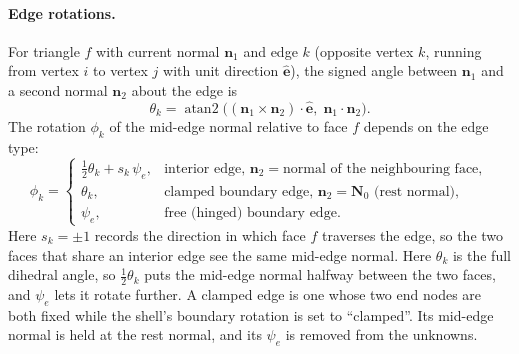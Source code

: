 \documentclass[11pt,a4paper]{article}
\newcommand{\vect}[1]{\bm{#1}}
\newcommand{\n}{\vect{n}}
\theoremstyle{remark}
\begin{document}
\paragraph{Edge rotations.} For triangle $f$ with current normal $\n_1$ and edge $k$ (opposite
vertex $k$, running from vertex $i$ to vertex $j$ with unit direction $\hat{\vect{e}}$), the
signed angle between $\n_1$ and a second normal $\n_2$ about the edge is
\begin{equation}
\theta_k = \operatorname{atan2}\big((\n_1\times\n_2)\cdot\hat{\vect{e}},\; \n_1\cdot\n_2\big).
\end{equation}
The rotation $\phi_k$ of the mid-edge normal relative to face $f$ depends on the edge type:
\begin{equation}
\phi_k = \begin{cases}
\tfrac12\theta_k + s_k\,\psi_e, & \text{interior edge, } \n_2 = \text{normal of the neighbouring face},\\[2pt]
\theta_k, & \text{clamped boundary edge, } \n_2 = \vect{N}_0 \text{ (rest normal)},\\[2pt]
\psi_e, & \text{free (hinged) boundary edge}.
\end{cases}
\end{equation}
Here $s_k=\pm1$ records the direction in which face $f$ traverses the edge, so the two faces that
share an interior edge see the same mid-edge normal. Here $\theta_k$ is the full dihedral angle,
so $\tfrac12\theta_k$ puts the mid-edge normal halfway between the two faces, and $\psi_e$ lets it
rotate further. A clamped edge is one whose two end nodes are both fixed while the shell's
boundary rotation is set to ``clamped''. Its mid-edge normal is held at the rest normal, and its
$\psi_e$ is removed from the unknowns.
\end{document}
